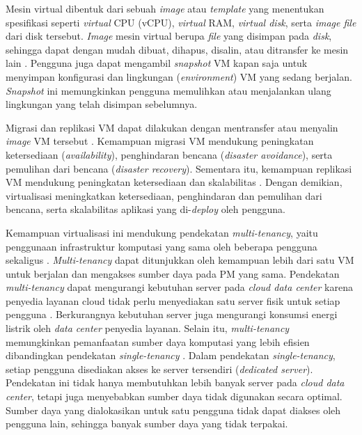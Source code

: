 Mesin virtual dibentuk dari sebuah \textit{image} atau \textit{template} yang menentukan spesifikasi seperti \textit{virtual} CPU (vCPU), \textit{virtual} RAM, \textit{virtual disk}, serta \textit{image file} dari disk tersebut. \textit{Image} mesin virtual berupa \textit{file} yang disimpan pada \textit{disk}, sehingga dapat dengan mudah dibuat, dihapus, disalin, atau ditransfer ke mesin lain \citep{Huawei}. Pengguna juga dapat mengambil \textit{snapshot} VM kapan saja untuk menyimpan konfigurasi dan lingkungan (\textit{environment}) VM yang sedang berjalan. \textit{Snapshot} ini memungkinkan pengguna memulihkan atau menjalankan ulang lingkungan yang telah disimpan sebelumnya.

Migrasi dan replikasi VM dapat dilakukan dengan mentransfer atau menyalin \textit{image} VM tersebut \citep{Huawei}. Kemampuan migrasi VM mendukung peningkatan ketersediaan (\textit{availability}), penghindaran bencana (\textit{disaster avoidance}), serta pemulihan dari bencana (\textit{disaster recovery}). Sementara itu, kemampuan replikasi VM mendukung peningkatan ketersediaan dan skalabilitas \citep{Hill2013}. Dengan demikian, virtualisasi meningkatkan ketersediaan, penghindaran dan pemulihan dari bencana, serta skalabilitas aplikasi yang di-\textit{deploy} oleh pengguna.

Kemampuan virtualisasi ini mendukung pendekatan \textit{multi-tenancy}, yaitu penggunaan infrastruktur komputasi yang sama oleh beberapa pengguna sekaligus \citep{Cloudflare}. \textit{Multi-tenancy} dapat ditunjukkan oleh kemampuan lebih dari satu VM untuk berjalan dan mengakses sumber daya pada PM yang sama. Pendekatan \textit{multi-tenancy} dapat mengurangi kebutuhan server pada \textit{cloud data center} karena penyedia layanan cloud tidak perlu menyediakan satu server fisik untuk setiap pengguna \citep{Hill2013}. Berkurangnya kebutuhan server juga mengurangi konsumsi energi listrik oleh \textit{data center} penyedia layanan. Selain itu, \textit{multi-tenancy} memungkinkan pemanfaatan sumber daya komputasi yang lebih efisien dibandingkan pendekatan \textit{single-tenancy} \citep{Cloudflare}. Dalam pendekatan \textit{single-tenancy}, setiap pengguna disediakan akses ke server tersendiri (\textit{dedicated server}). Pendekatan ini tidak hanya membutuhkan lebih banyak server pada \textit{cloud data center}, tetapi juga menyebabkan sumber daya tidak digunakan secara optimal. Sumber daya yang dialokasikan untuk satu pengguna tidak dapat diakses oleh pengguna lain, sehingga banyak sumber daya yang tidak terpakai. 
